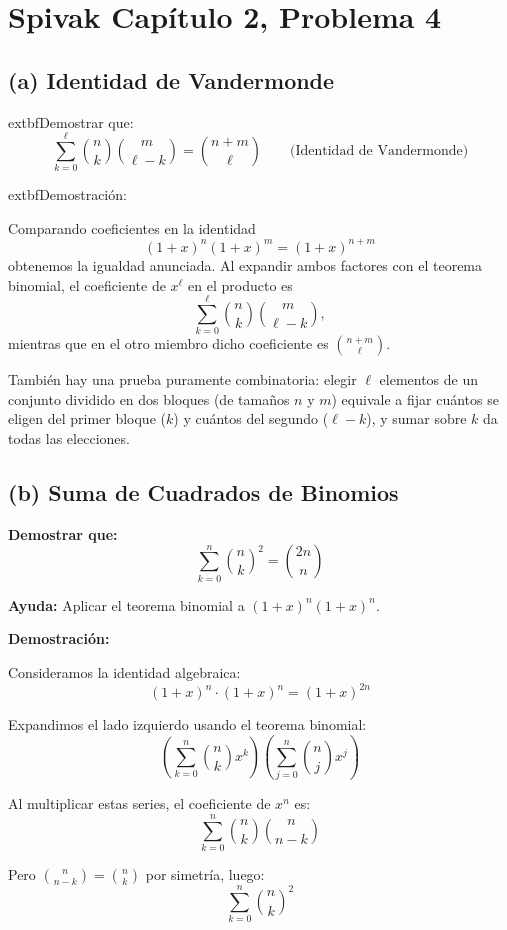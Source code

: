 \section*{Spivak Capítulo 2, Problema 4}

\subsection*{(a) Identidad de Vandermonde}

	extbf{Demostrar que:}
\[
\sum_{k=0}^{\ell} \binom{n}{k}\binom{m}{\ell-k} = \binom{n+m}{\ell} \qquad\text{(Identidad de Vandermonde)}
\]

	extbf{Demostración:}

Comparando coeficientes en la identidad
\[
(1+x)^n(1+x)^m=(1+x)^{n+m}
\]
obtenemos la igualdad anunciada. Al expandir ambos factores con el teorema binomial, el coeficiente de $x^{\ell}$ en el producto es
\[
\sum_{k=0}^{\ell}\binom{n}{k}\binom{m}{\ell-k},
\]
mientras que en el otro miembro dicho coeficiente es $\binom{n+m}{\ell}$.

También hay una prueba puramente combinatoria: elegir $\ell$ elementos de un conjunto dividido en dos bloques (de tamaños $n$ y $m$) equivale a fijar cuántos se eligen del primer bloque ($k$) y cuántos del segundo ($\ell-k$), y sumar sobre $k$ da todas las elecciones.

\subsection*{(b) Suma de Cuadrados de Binomios}

\textbf{Demostrar que:}
\[
\sum_{k=0}^{n} \binom{n}{k}^2 = \binom{2n}{n}
\]

\textbf{Ayuda:} Aplicar el teorema binomial a $(1+x)^n(1+x)^n$.

\textbf{Demostración:}

Consideramos la identidad algebraica:
\[
(1+x)^n \cdot (1+x)^n = (1+x)^{2n}
\]

Expandimos el lado izquierdo usando el teorema binomial:
\[
\left(\sum_{k=0}^{n} \binom{n}{k} x^k\right) \left(\sum_{j=0}^{n} \binom{n}{j} x^j\right)
\]

Al multiplicar estas series, el coeficiente de $x^n$ es:
\[
\sum_{k=0}^{n} \binom{n}{k} \binom{n}{n-k}
\]

Pero $\binom{n}{n-k} = \binom{n}{k}$ por simetría, luego:
\[
\sum_{k=0}^{n} \binom{n}{k}^2
\]

